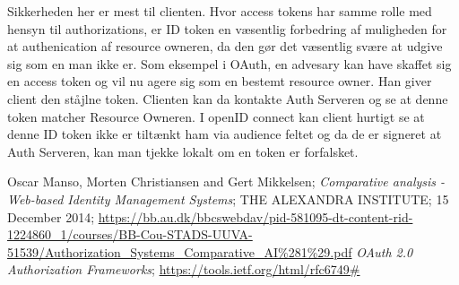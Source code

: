 \documentclass[a4paper,12pt]{article}
\theoremstyle{plain}
\theoremstyle{nonumberplain}
\begin{document}
Sikkerheden her er mest til clienten. Hvor access tokens har samme rolle med hensyn til authorizations, er ID token en væsentlig forbedring af muligheden for at authenication af resource owneren, da den gør det væsentlig svære at udgive sig som en man ikke er. Som eksempel i OAuth, en advesary kan have skaffet sig en access token og vil nu agere sig som en bestemt resource owner. Han giver client den ståjlne token. Clienten kan da kontakte Auth Serveren og se at denne token matcher Resource Owneren. I openID connect kan client hurtigt se at denne ID token ikke er tiltænkt ham via audience feltet og da de er signeret at Auth Serveren, kan man tjekke lokalt om en token er forfalsket.


\begin{thebibliography}{9}

    Oscar Manso, Morten Christiansen and Gert Mikkelsen;
    \emph{Comparative analysis - Web-based Identity Management Systems};
    THE ALEXANDRA INSTITUTE;
    15 December 2014;
    \url{https://bb.au.dk/bbcswebdav/pid-581095-dt-content-rid-1224860_1/courses/BB-Cou-STADS-UUVA-51539/Authorization_Systems_Comparative_AI%281%29.pdf}
    \emph{OAuth 2.0 Authorization Frameworks};
    \url{https://tools.ietf.org/html/rfc6749#}
\end{thebibliography}
\end{document}
